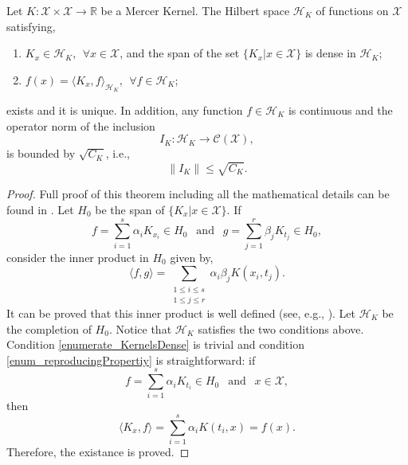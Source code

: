 \begin{theorem} \label{theorem_RKHS}
  Let $K: \mathcal{X} \times \mathcal{X} \to \mathbb{R}$ be a Mercer Kernel. The Hilbert space $\mathcal{H}_K$ of functions on $\mathcal{X}$ satisfying,
  \begin{enumerate}
    \item $K_x \in \mathcal{H}_K, \ \ \forall x \in \mathcal{X}$, and the span of the set $\{ K_x | x \in \mathcal{X} \}$ is dense in $\mathcal{H}_K$; \label{enumerate_KernelsDense}
    \item $f(x) = \langle K_x,f \rangle_{\mathcal{H}_K}, \ \ \forall f \in \mathcal{H}_K$; \label{enum_reproducingPropertiy}
  \end{enumerate}
  exists and it is unique. In addition, any function $f \in \mathcal{H}_K$ is continuous and the operator norm of the inclusion
  \begin{equation*}
    I_K : \mathcal{H}_K \to \mathcal{C}(\mathcal{X}),
  \end{equation*}
  is bounded by $\sqrt{C_K}$, i.e.,
  \begin{equation*}
    \|I_K\| \leq \sqrt{C_K}.
  \end{equation*}

  \begin{proof}
    Full proof of this theorem including all the mathematical details can be found in \textcite{cucker2007}.
    Let $H_0$ be the span of $\{ K_x | x \in \mathcal{X} \}$. If
    \begin{equation*}
      f = \sum_{i=1}^s \alpha_i K_{x_i} \in H_0 \ \ \text{ and } \ \
      g = \sum_{j=1}^r \beta_j K_{t_j} \in H_0,  
    \end{equation*}
    consider the inner product in $H_0$ given by,
    \begin{equation} \label{eq_innerproductH0}
      \langle f,g \rangle = \sum_{\substack{1 \leq i \leq s \\ 1 \leq j \leq r}}
                                         \alpha_i \beta_j K(x_i,t_j).
    \end{equation}
    It can be proved that this inner product is well defined (see, e.g., \textcite{cucker2007}). %
    Let $\mathcal{H}_K$ be the completion of $H_0$. Notice that $\mathcal{H}_K$ satisfies the two conditions above. Condition \ref{enumerate_KernelsDense} is trivial and condition \ref{enum_reproducingPropertiy} is straightforward: if
    \begin{equation*} 
      f = \sum_{i=1}^s \alpha_i K_{t_i} \in H_0 \ \ \text{ and } \ \ x \in \mathcal{X},
    \end{equation*}
    then
    \begin{equation*}
      \langle K_x,f \rangle = \sum_{i=1}^s \alpha_i K(t_i,x) = f(x). 
    \end{equation*} 
    Therefore, the existance is proved. 


\end{proof}
\end{theorem}
